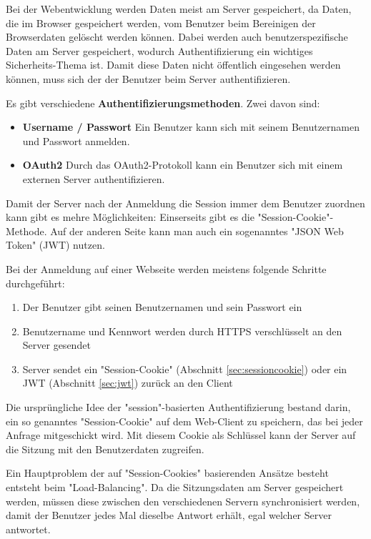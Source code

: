 

Bei der Webentwicklung werden Daten meist am Server gespeichert, da Daten, die im Browser gespeichert werden, vom Benutzer beim Bereinigen der Browserdaten gelöscht werden können. Dabei werden auch benutzerspezifische Daten am Server gespeichert, wodurch Authentifizierung ein wichtiges Sicherheits-Thema ist.
Damit diese Daten nicht öffentlich eingesehen werden können, muss sich der der Benutzer beim Server authentifizieren.

Es gibt verschiedene \textbf{Authentifizierungsmethoden}. Zwei davon sind:
\begin{itemize} 
    \item \textbf{Username / Passwort} Ein Benutzer kann sich mit seinem Benutzernamen und Passwort anmelden.
    \item \textbf{OAuth2} Durch das OAuth2-Protokoll kann ein Benutzer sich mit einem externen Server authentifizieren. \cite{OAuth2}
\end{itemize}

Damit der Server nach der Anmeldung die Session immer dem Benutzer zuordnen kann gibt es mehre Möglichkeiten:
Einserseits gibt es die "Session-Cookie"-Methode. Auf der anderen Seite kann man auch ein sogenanntes "JSON Web Token" (JWT) nutzen.

Bei der Anmeldung auf einer Webseite werden meistens folgende Schritte durchgeführt:
\begin{enumerate}
    \item Der Benutzer gibt seinen Benutzernamen und sein Passwort ein
    \item Benutzername und Kennwort werden durch HTTPS verschlüsselt an den Server gesendet
    \item Server sendet ein "Session-Cookie" (Abschnitt \ref{sec:sessioncookie}) oder ein JWT (Abschnitt \ref{sec:jwt}) zurück an den Client
\end{enumerate}

\pagebreak
{}\label{sec:sessioncookie}

Die ursprüngliche Idee der "session"-basierten Authentifizierung bestand darin, ein so genanntes "Session-Cookie" auf dem Web-Client zu speichern, das bei jeder Anfrage mitgeschickt wird. Mit diesem Cookie als Schlüssel kann der Server auf die Sitzung mit den Benutzerdaten zugreifen. 

Ein Hauptproblem der auf "Session-Cookies" basierenden Ansätze besteht entsteht beim "Load-Balancing". 
Da die Sitzungsdaten am Server gespeichert werden, müssen diese zwischen den verschiedenen Servern synchronisiert werden, damit der Benutzer jedes Mal dieselbe Antwort erhält, egal welcher Server antwortet. 

